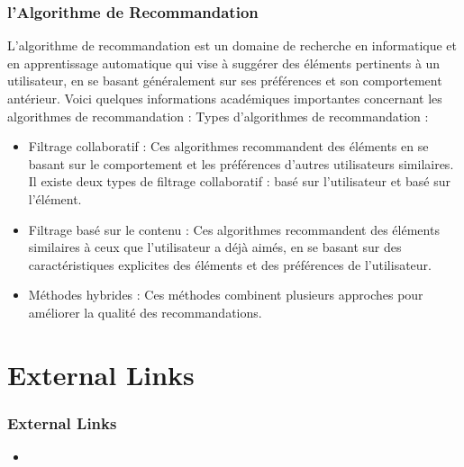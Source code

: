 \documentclass[20pt]{beamer}
\begin{document}
\begin{frame}
    \frametitle{l'Algorithme de Recommandation}
        L'algorithme de recommandation est un domaine de recherche en informatique et en apprentissage automatique qui vise à suggérer des éléments pertinents à un utilisateur, en se basant généralement sur ses préférences et son comportement antérieur. Voici quelques informations académiques importantes concernant les algorithmes de recommandation :
        Types d'algorithmes de recommandation :
        \begin{itemize}
            \item Filtrage collaboratif : Ces algorithmes recommandent des éléments en se basant sur le comportement et les préférences d'autres utilisateurs similaires. Il existe deux types de filtrage collaboratif : basé sur l'utilisateur et basé sur l'élément.
            \item Filtrage basé sur le contenu : Ces algorithmes recommandent des éléments similaires à ceux que l'utilisateur a déjà aimés, en se basant sur des caractéristiques explicites des éléments et des préférences de l'utilisateur.
            \item Méthodes hybrides : Ces méthodes combinent plusieurs approches pour améliorer la qualité des recommandations.
        \end{itemize}
\end{frame}

\section{External Links}

\begin{frame}
    \frametitle{External Links}
    \begin{itemize}
        \item  
    \end{itemize}
\end{frame}
\end{document}
